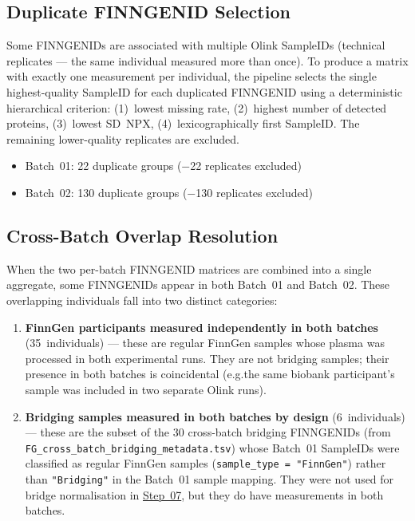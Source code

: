 \documentclass[11pt,a4paper]{article}
\begin{document}
\subsection{Duplicate FINNGENID Selection}

Some FINNGENIDs are associated with multiple Olink SampleIDs (technical
replicates --- the same individual measured more than once). To produce a
matrix with exactly one measurement per individual, the pipeline selects the
single highest-quality SampleID for each duplicated FINNGENID using a
deterministic hierarchical criterion: (1)~lowest missing rate, (2)~highest
number of detected proteins, (3)~lowest SD~NPX, (4)~lexicographically first
SampleID. The remaining lower-quality replicates are excluded.

\begin{itemize}
  \item Batch~01: 22 duplicate groups ($-$22 replicates excluded)
  \item Batch~02: 130 duplicate groups ($-$130 replicates excluded)
\end{itemize}

\subsection{Cross-Batch Overlap Resolution}

When the two per-batch FINNGENID matrices are combined into a single
aggregate, some FINNGENIDs appear in both Batch~01 and Batch~02. These
overlapping individuals fall into two distinct categories:

\begin{enumerate}
  \item \textbf{FinnGen participants measured independently in both batches}
        (35~individuals) --- these are regular FinnGen samples whose plasma
        was processed in both experimental runs. They are not bridging
        samples; their presence in both batches is coincidental (e.g.\@ the
        same biobank participant's sample was included in two separate Olink
        runs).
  \item \textbf{Bridging samples measured in both batches by design}
        (6~individuals) --- these are the subset of the 30 cross-batch
        bridging FINNGENIDs (from
        \texttt{FG\_cross\_batch\_bridging\_metadata.tsv}) whose Batch~01
        SampleIDs were classified as regular FinnGen samples
        (\texttt{sample\_type\,=\,"FinnGen"}) rather than
        \texttt{"Bridging"} in the Batch~01 sample mapping. They were not
        used for bridge normalisation in
        \href{https://github.com/FINNGEN/FinnGen3-proteomics-pipeline#pipeline-steps}{Step~07},
        but they do have measurements in both batches.
\end{enumerate}
\end{document}

